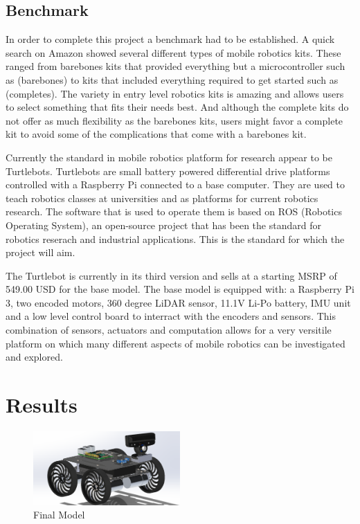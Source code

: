\documentclass[12pt, letterpaper,titlepage]{article}
\begin{document}
\subsection{Benchmark}

	In order to complete this project a benchmark had to be established. A quick search on Amazon showed several different types of mobile robotics kits. These ranged from barebones kits that provided everything but a microcontroller such as (barebones) to kits that included everything required to get started such as (completes). The variety in entry level robotics kits is amazing and allows users to select something that fits their needs best. And although the complete kits do not offer as much flexibility as the barebones kits, users might favor a complete kit to avoid some of the complications that come with a barebones kit. 

	Currently the standard in mobile robotics platform for research appear to be Turtlebots. Turtlebots are small battery powered differential drive platforms controlled with a Raspberry Pi connected to a base computer. They are used to teach robotics classes at universities and as platforms for current robotics research. The software that is used to operate them is based on ROS (Robotics Operating System), an open-source project that has been the standard for robotics reserach and industrial applications. This is the standard for which the project will aim.

	The Turtlebot is currently in its third version and sells at a starting MSRP of 549.00 USD for the base model. The base model is equipped with: a Raspberry Pi 3, two encoded motors, 360 degree LiDAR sensor, 11.1V Li-Po battery, IMU unit and a low level control board to interract with the encoders and sensors. This combination of sensors, actuators and computation allows for a very versitile platform on which many different aspects of mobile robotics can be investigated and explored.

\section{Results}

	\begin{figure}[h]
		\includegraphics[width=0.5\textwidth]{final.png}
		\centering
		\caption{Final Model}
	\end{figure}
\end{document}
